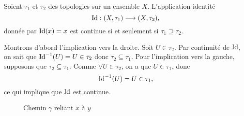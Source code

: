 \documentclass[french]{article}
\begin{document}
\begin{lemme}
  Soient $\tau_1$ et $\tau_2$ des topologies sur un ensemble $X$. L'application identité
  $$\operatorname{Id}: (X, \tau_1) \longrightarrow (X, \tau_2),$$
  donnée par $\operatorname{Id}(x) = x$ est continue si et seulement si $\tau_1 \supseteq \tau_2$.

  \tcblower
  \begin{preuve}
    Montrons d'abord l'implication vers la droite. Soit $U \in \tau_2$. Par continuité de $\operatorname{Id}$, on sait que $\operatorname{Id}^{-1}(U) = U \in \tau_2$ donc $\tau_2 \subseteq \tau_1$.
    Pour l'implication vers la gauche, supposons que $\tau_2 \subseteq \tau_1$. Comme $\forall U \in \tau_2$, on a que $U \in \tau_1$, donc
    $$\operatorname{Id}^{-1}(U) = U \in \tau_1,$$
    ce qui implique que $\operatorname{Id}$ est continue.
  \end{preuve}
\end{lemme}


\newpage

\begin{figure}[ht]
  \centering
  \caption{Chemin $\gamma$ reliant $x$ à $y$}
\end{figure}
\end{document}
